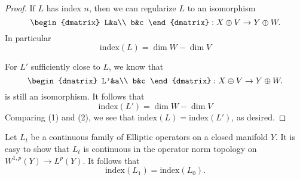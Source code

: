 \documentclass{amsart}
\begin{document}
   \begin{proof}
     If $L$ has index $n$, then we can regularize $L$ to an isomorphism
     \begin{equation*}
       \begin{dmatrix}
         L&a\\
         b&c
       \end{dmatrix}:X\oplus V\to Y\oplus W.
     \end{equation*}
     In particular
     \begin{equation*}\tag{1}
       \text{index}(L)=\dim W-\dim V
     \end{equation*}
     
     For $L'$ sufficiently close to $L$, we know that
     \begin{equation*}
       \begin{dmatrix}
         L'&a\\
         b&c
       \end{dmatrix}:X\oplus V\to Y\oplus W.
     \end{equation*}
     is still an isomorphism. It follows that
     \begin{equation*}\tag{2}
       \text{index}(L')=\dim W-\dim V
     \end{equation*}
     Comparing (1) and (2), we see that
     $\text{index}(L)=\text{index}(L')$, as desired.
   \end{proof}
   \begin{cor}
     Let $L_{t}$ be a continuous family of Elliptic operators on a
     closed manifold $Y$. It is easy to show that $L_{t}$ is
     continuous in the operator norm topology on $W^{1,p}(Y)\to
     L^{p}(Y)$. It follows that
     \begin{equation*}
       \text{index}(L_{1})=\text{index}(L_{0}).
     \end{equation*}
   \end{cor}   
 
\end{document}
